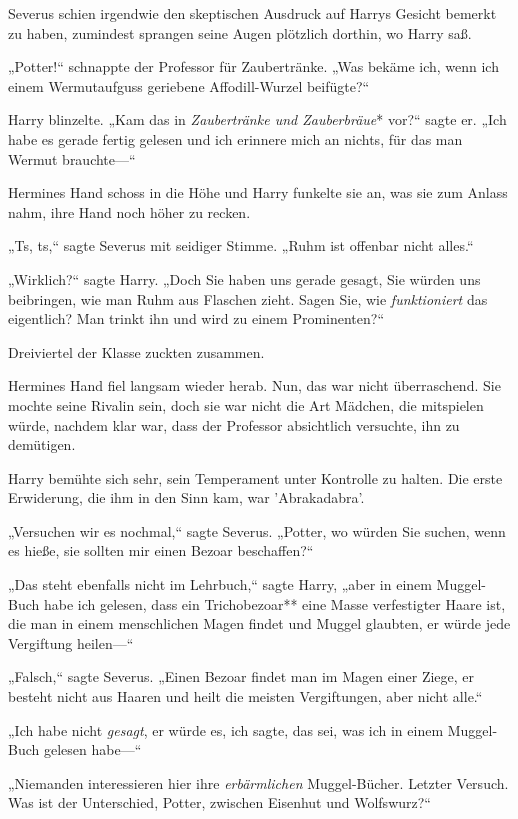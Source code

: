 {Severus schien irgendwie den skeptischen Ausdruck auf Harrys Gesicht bemerkt zu haben, zumindest sprangen seine Augen plötzlich dorthin, wo Harry saß.

„Potter!“ schnappte der Professor für Zaubertränke. „Was bekäme ich, wenn ich einem Wermutaufguss geriebene Affodill-Wurzel beifügte?“

Harry blinzelte. „Kam das in \emph{Zaubertränke und Zauberbräue}* vor?“ sagte er. „Ich habe es gerade fertig gelesen und ich erinnere mich an nichts, für das man Wermut brauchte—“

Hermines Hand schoss in die Höhe und Harry funkelte sie an, was sie zum Anlass nahm, ihre Hand noch höher zu recken.

„Ts, ts,“ sagte Severus mit seidiger Stimme. „Ruhm ist offenbar nicht alles.“

„Wirklich?“ sagte Harry. „Doch Sie haben uns gerade gesagt, Sie würden uns beibringen, wie man Ruhm aus Flaschen zieht. Sagen Sie, wie \emph{funktioniert} das eigentlich? Man trinkt ihn und wird zu einem Prominenten?“

Dreiviertel der Klasse zuckten zusammen.

Hermines Hand fiel langsam wieder herab. Nun, das war nicht überraschend. Sie mochte seine Rivalin sein, doch sie war nicht die Art Mädchen, die mitspielen würde, nachdem klar war, dass der Professor absichtlich versuchte, ihn zu demütigen.

Harry bemühte sich sehr, sein Temperament unter Kontrolle zu halten. Die erste Erwiderung, die ihm in den Sinn kam, war 'Abrakadabra'.

„Versuchen wir es nochmal,“ sagte Severus. „Potter, wo würden Sie suchen, wenn es hieße, sie sollten mir einen Bezoar beschaffen?“

„Das steht ebenfalls nicht im Lehrbuch,“ sagte Harry, „aber in einem Muggel-Buch habe ich gelesen, dass ein Trichobezoar** eine Masse verfestigter Haare ist, die man in einem menschlichen Magen findet und Muggel glaubten, er würde jede Vergiftung heilen—“

„Falsch,“ sagte Severus. „Einen Bezoar findet man im Magen einer Ziege, er besteht nicht aus Haaren und heilt die meisten Vergiftungen, aber nicht alle.“

„Ich habe nicht \emph{gesagt}, er würde es, ich sagte, das sei, was ich in einem Muggel-Buch gelesen habe—“

„Niemanden interessieren hier ihre \emph{erbärmlichen} Muggel-Bücher. Letzter Versuch. Was ist der Unterschied, Potter, zwischen Eisenhut und Wolfswurz?“

}
